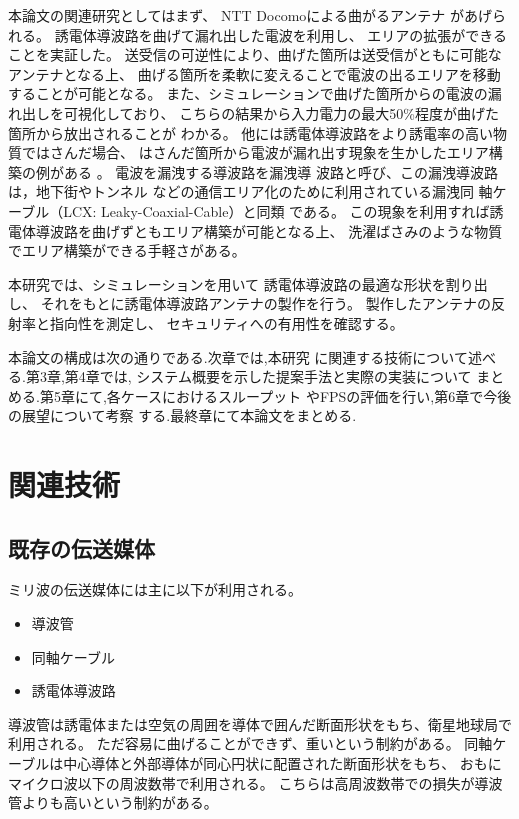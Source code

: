 \documentclass[technicalreport]{ieicej}
\begin{document}
本論文の関連研究としてはまず、
NTT Docomoによる曲がるアンテナ
\cite{bending_antenna} \cite{leaky_wave_antenna_bent_dielectric}
があげられる。
誘電体導波路を曲げて漏れ出した電波を利用し、
エリアの拡張ができることを実証した。
送受信の可逆性により、曲げた箇所は送受信がともに可能なアンテナとなる上、
曲げる箇所を柔軟に変えることで電波の出るエリアを移動することが可能となる。
また、シミュレーションで曲げた箇所からの電波の漏れ出しを可視化しており、
こちらの結果から入力電力の最大50\%程度が曲げた箇所から放出されることが
わかる。
他には誘電体導波路をより誘電率の高い物質ではさんだ場合、
はさんだ箇所から電波が漏れ出す現象を生かしたエリア構築の例がある
\cite{pinching_antenna}。
電波を漏洩する導波路を漏洩導
波路と呼び、この漏洩導波路は，地下街やトンネル
などの通信エリア化のために利用されている漏洩同
軸ケーブル（LCX: Leaky-Coaxial-Cable）と同類
である。
この現象を利用すれば誘電体導波路を曲げずともエリア構築が可能となる上、
洗濯ばさみのような物質でエリア構築ができる手軽さがある。

本研究では、シミュレーションを用いて
誘電体導波路の最適な形状を割り出し、
それをもとに誘電体導波路アンテナの製作を行う。
製作したアンテナの反射率と指向性を測定し、
セキュリティへの有用性を確認する。

本論文の構成は次の通りである.次章では,本研究
に関連する技術について述べる.第3章,第4章では,
システム概要を示した提案手法と実際の実装について
まとめる.第5章にて,各ケースにおけるスループット
やFPSの評価を行い,第6章で今後の展望について考察
する.最終章にて本論文をまとめる.

\section{関連技術}

\subsection{既存の伝送媒体}

ミリ波の伝送媒体には主に以下が利用される。
\begin{itemize}
  \item 導波管
  \item 同軸ケーブル
  \item 誘電体導波路
\end{itemize}

導波管は誘電体または空気の周囲を導体で囲んだ断面形状をもち、衛星地球局で利用される。
ただ容易に曲げることができず、重いという制約がある。
同軸ケーブルは中心導体と外部導体が同心円状に配置された断面形状をもち、
おもにマイクロ波以下の周波数帯で利用される。
こちらは高周波数帯での損失が導波管よりも高いという制約がある。
\end{document}
